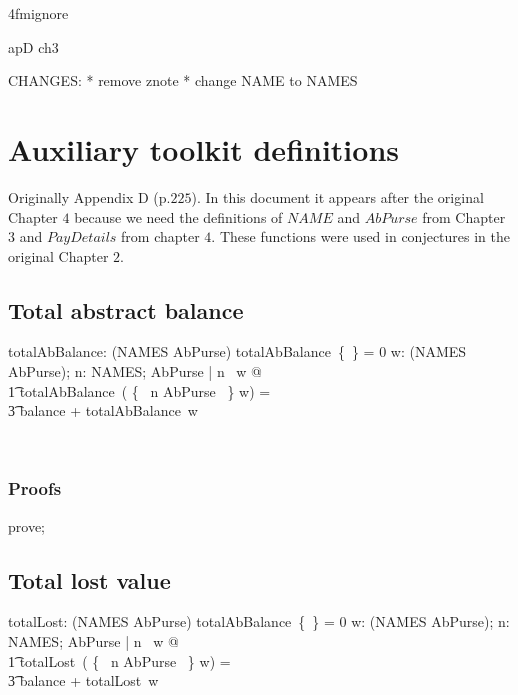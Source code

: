 \ai4fmignore{
\begin{zsection}
  \SECTION apD \parents ch3
\end{zsection}
CHANGES:
* remove znote 
* change NAME to NAMES
}

\chapter{Auxiliary toolkit definitions}\label{apD}

Originally Appendix D (p.$225$). In this document it appears after the original
Chapter $4$ because we need the definitions of $NAME$ and $AbPurse$ from
Chapter $3$ and $PayDetails$ from chapter $4$. These functions were used in
conjectures in the original Chapter $2$.

\section{Total abstract balance}

\begin{LADef}
\begin{axdef}
   totalAbBalance: (NAMES \ffun AbPurse) \fun \nat
\where
      totalAbBalance~\{~\} = 0
   \also
      \forall w: (NAMES \ffun AbPurse); n: NAMES; AbPurse | n \notin \dom~w @ \\
          \t1 totalAbBalance~( \{~ n \mapsto \theta AbPurse ~\} \cup w) = \\
                \t3 balance + totalAbBalance~w
\end{axdef}~\end{LADef}

\subsection*{Proofs}

\begin{LDCheck}\begin{zproof}
   prove;
\end{zproof}\end{LDCheck}

\section{Total lost value}

\begin{LADef}
\begin{axdef}
   totalLost: (NAMES \ffun AbPurse) \fun \nat
\where
      totalAbBalance~\{~\} = 0
   \also
      \forall w: (NAMES \ffun AbPurse); n: NAMES; AbPurse | n \notin \dom~w @ \\
          \t1 totalLost~( \{~ n \mapsto \theta AbPurse ~\} \cup w) = \\
                \t3 balance + totalLost~w
\end{axdef}~\end{LADef}


